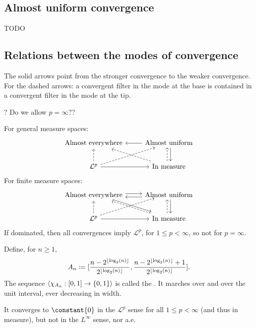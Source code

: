 \subsection{Almost uniform convergence}
TODO

\subsection{Relations between the modes of convergence}
The solid arrows point from the stronger convergence to the weaker convergence. For the dashed arrows: a convergent filter in the mode at the base is contained in a convergent filter in the mode at the tip.

? Do we allow $p=\infty$??

For general measure spaces:
\[ \begin{tikzcd}
\text{Almost everywhere} & \ar[l] \ar[d, shift left] \text{Almost uniform} \\
\mathcal{L}^p \ar[ur, dashed] \ar[r] \ar[u, dashed] & \text{In measure} \ar[u, shift left, dashed] \ar[ul, dashed]
\end{tikzcd} \]
For finite measure spaces:
\[ \begin{tikzcd}
\text{Almost everywhere} \ar[r, shift left] \ar[dr, shift left] & \ar[l, shift left] \ar[d, shift left] \text{Almost uniform} \\
\mathcal{L}^p \ar[ur, shift left, dashed] \ar[r] \ar[u, dashed] & \text{In measure} \ar[u, shift left, dashed] \ar[ul, dashed]
\end{tikzcd} \]
If dominated, then all convergences imply $\mathcal{L}^p$, for $1\leq p < \infty$, so not for $p = \infty$.

\begin{example}
Define, for $n\geq 1$,
\[ A_n \defeq \interval{\frac{n-2^{\floor{\log_2(n)}}}{2^{\floor{\log_2(n)}}}, \frac{n-2^{\floor{\log_2(n)}}+1}{2^{\floor{\log_2(n)}}}}. \]
The sequence $\seq{\charFunc{A_n}: \interval{0,1} \to \{0,1\}}$
is called the . It marches over and over the unit interval, ever decreasing in width.


It converges to $\constant{0}$ in the $\mathcal{L}^p$ sense for all $1\leq p < \infty$ (and thus in measure), but not in the $L^\infty$ sense, nor a.e.
\end{example}

